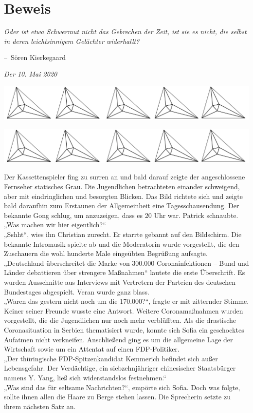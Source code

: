 \documentclass[oneside]{memoir}
\makeatletter
\newcommand{\parasep}{
\bigskip
\bigskip
\begin{center} 
   \includegraphics[scale=.08]{parasep5.jpg} 
\end{center}
\bigskip
\bigskip
}
\newenvironment{chapquote}[2][2em]
  {\setlength{\@tempdima}{#1}%
   \def\chapquote@author{#2}%
   \parshape 1 \@tempdima \dimexpr\textwidth-2\@tempdima\relax%
   \itshape}
  {\par\normalfont\hfill--\ \chapquote@author\hspace*{\@tempdima}\par\bigskip}
\makeatother
\begin{document}
\chapter{Beweis} %
\begin{chapquote}{Sören Kierkegaard}
\glqq Oder ist etwa Schwermut nicht das Gebrechen der Zeit, ist sie es nicht, die selbst in deren leichtsinnigem Gelächter widerhallt?\grqq
\end{chapquote}
     \textit{Der 10. Mai 2020} \\
     
     \parasep
     
     \parasep
     Der Kassettenspieler fing zu surren an und bald darauf zeigte der angeschlossene Fernseher statisches Grau. Die Jugendlichen betrachteten einander schweigend, aber mit eindringlichen und besorgten Blicken. Das Bild richtete sich und zeigte bald daraufhin zum Erstaunen der Allgemeinheit eine Tagesschausendung. Der bekannte Gong schlug, um anzuzeigen, dass es 20 Uhr war. Patrick schnaubte.
„Was machen wir hier eigentlich?“ \\
„Sshht“, wies ihn Christian zurecht. Er starrte gebannt auf den Bildschirm. Die bekannte Intromusik spielte ab und die Moderatorin wurde vorgestellt, die den Zuschauern die wohl hunderte Male eingeübten Begrüßung aufsagte. \\
„Deutschland überschreitet die Marke von 300.000 Coronainfektionen – Bund und Länder debattieren über strengere Maßnahmen“ lautete die erste Überschrift. Es wurden Ausschnitte aus Interviews mit Vertretern der Parteien des deutschen Bundestages abgespielt. Veran wurde ganz blass. \\
„Waren das gestern nicht noch um die 170.000?“, fragte er mit zitternder Stimme. Keiner seiner Freunde wusste eine Antwort. Weitere Coronamaßnahmen wurden vorgestellt, die die Jugendlichen nur noch mehr verblüfften. Als die drastische Coronasituation in Serbien thematisiert wurde, konnte sich Sofia ein geschocktes Aufatmen nicht verkneifen. Anschließend ging es um die allgemeine Lage der Wirtschaft sowie um ein Attentat auf einen FDP-Politiker. \\
„Der thüringische FDP-Spitzenkandidat Kemmerich befindet sich außer Lebensgefahr. Der Verdächtige, ein siebzehnjähriger chinesischer Staatsbürger namens Y. Yang, ließ sich widerstandslos festnehmen.“ \\
„Was sind das für seltsame Nachrichten?“, empörte sich Sofia. Doch was folgte, sollte ihnen allen die Haare zu Berge stehen lassen. Die Sprecherin setzte zu ihrem nächsten Satz an. \\
\end{document}
